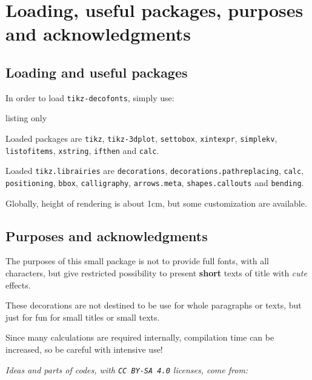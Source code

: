\documentclass[11pt,a4paper]{ltxdoc}
\begin{document}
\pagebreak

\section{Loading, useful packages, purposes and acknowledgments}

\subsection{Loading and useful packages}

In order to load \texttt{tikz-decofonts}, simply use:

\begin{DemoCode}{listing only}
\usepackage{tikz-decofonts}
\end{DemoCode}

Loaded packages are \texttt{tikz}, \texttt{tikz-3dplot}, \texttt{settobox}, \texttt{xintexpr}, \texttt{simplekv}, \texttt{listofitems}, \texttt{xstring}, \texttt{ifthen} and \texttt{calc}.

Loaded \texttt{tikz.librairies} are \texttt{decorations}, \texttt{decorations.pathreplacing}, \texttt{calc}, \texttt{positioning}, \texttt{bbox}, \texttt{calligraphy}, \texttt{arrows.meta}, \texttt{shapes.callouts} and \texttt{bending}.

\smallskip

Globally, height of rendering is about 1cm, but some customization are available.

\subsection{Purposes and acknowledgments}

The purposes of this small package is not to provide full fonts, with all characters, but give restricted possibility to present \textbf{short} texts of title with \textit{cute} effects.

\smallskip

These decorations are not destined to be use for whole paragraphs or texts, but just for fun for small titles or small texts.

\smallskip

Since many calculations are required internally, compilation time can be increased, so be careful with intensive use!

\smallskip

\textit{Ideas and parts of codes, with \texttt{CC\,BY-SA\,4.0} licenses, come from:}
\end{document}
